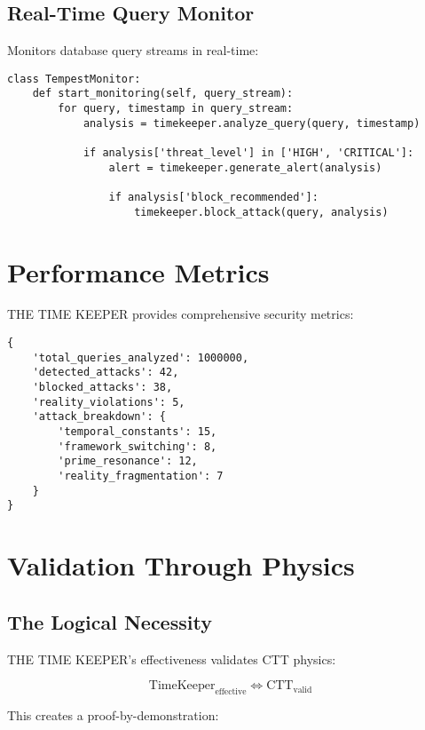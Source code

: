 \documentclass[11pt,a4paper]{article}
\begin{document}
\subsection{Real-Time Query Monitor}

Monitors database query streams in real-time:

\begin{verbatim}
class TempestMonitor:
    def start_monitoring(self, query_stream):
        for query, timestamp in query_stream:
            analysis = timekeeper.analyze_query(query, timestamp)
            
            if analysis['threat_level'] in ['HIGH', 'CRITICAL']:
                alert = timekeeper.generate_alert(analysis)
                
                if analysis['block_recommended']:
                    timekeeper.block_attack(query, analysis)
\end{verbatim}

\section{Performance Metrics}

THE TIME KEEPER provides comprehensive security metrics:

\begin{verbatim}
{
    'total_queries_analyzed': 1000000,
    'detected_attacks': 42,
    'blocked_attacks': 38,
    'reality_violations': 5,
    'attack_breakdown': {
        'temporal_constants': 15,
        'framework_switching': 8,
        'prime_resonance': 12,
        'reality_fragmentation': 7
    }
}
\end{verbatim}

\section{Validation Through Physics}

\subsection{The Logical Necessity}

THE TIME KEEPER's effectiveness validates CTT physics:

\begin{equation}
\text{TimeKeeper}_{\text{effective}} \iff \text{CTT}_{\text{valid}}
\end{equation}

This creates a proof-by-demonstration:
\end{document}
